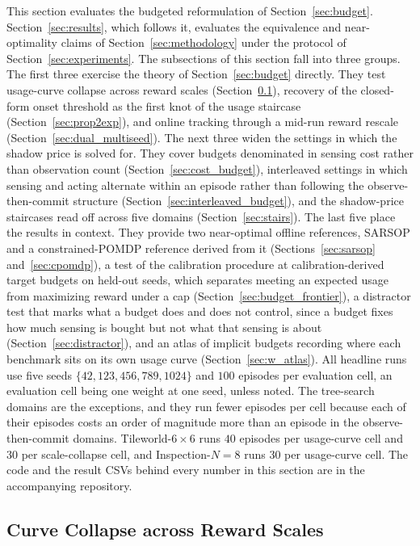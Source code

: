 This section evaluates the budgeted reformulation of Section~\ref{sec:budget}. Section~\ref{sec:results}, which follows it, evaluates the equivalence and near-optimality claims of Section~\ref{sec:methodology} under the protocol of Section~\ref{sec:experiments}. The subsections of this section fall into three groups. The first three exercise the theory of Section~\ref{sec:budget} directly. They test usage-curve collapse across reward scales (Section~\ref{sec:collapse}), recovery of the closed-form onset threshold as the first knot of the usage staircase (Section~\ref{sec:prop2exp}), and online tracking through a mid-run reward rescale (Section~\ref{sec:dual_multiseed}). The next three widen the settings in which the shadow price is solved for. They cover budgets denominated in sensing cost rather than observation count (Section~\ref{sec:cost_budget}), interleaved settings in which sensing and acting alternate within an episode rather than following the observe-then-commit structure (Section~\ref{sec:interleaved_budget}), and the shadow-price staircases read off across five domains (Section~\ref{sec:stairs}). The last five place the results in context. They provide two near-optimal offline references, SARSOP and a constrained-POMDP reference derived from it (Sections~\ref{sec:sarsop} and~\ref{sec:cpomdp}), a test of the calibration procedure at calibration-derived target budgets on held-out seeds, which separates meeting an expected usage from maximizing reward under a cap (Section~\ref{sec:budget_frontier}), a distractor test that marks what a budget does and does not control, since a budget fixes how much sensing is bought but not what that sensing is about (Section~\ref{sec:distractor}), and an atlas of implicit budgets recording where each benchmark sits on its own usage curve (Section~\ref{sec:w_atlas}). All headline runs use five seeds $\{42,123,456,789,1024\}$ and $100$ episodes per evaluation cell, an evaluation cell being one weight at one seed, unless noted. The tree-search domains are the exceptions, and they run fewer episodes per cell because each of their episodes costs an order of magnitude more than an episode in the observe-then-commit domains. Tileworld-$6{\times}6$ runs $40$ episodes per usage-curve cell and $30$ per scale-collapse cell, and Inspection-$N{=}8$ runs $30$ per usage-curve cell. The code and the result CSVs behind every number in this section are in the accompanying repository.

\subsection{Curve Collapse across Reward Scales}
\label{sec:collapse}

